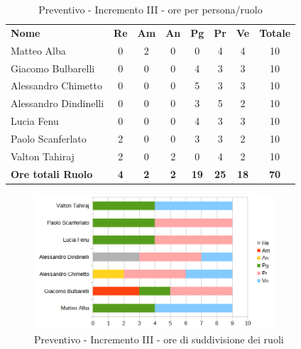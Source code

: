 	\begin{table} [h!]
	\begin{center}
		\begin{tabular} { m{3.5cm} c c c c c c c }
			\rowcolor{lightgray}
			\textbf{Nome} & \textbf{Re} & \textbf{Am} & \textbf{An} & \textbf{Pg} & \textbf{Pr} & \textbf{Ve} & \textbf{Totale} \\
			Matteo Alba &0 &2 & 0& 0 &4 & 4 & 10 \\
			Giacomo Bulbarelli & 0 &0 & 0& 4 & 3 & 3 & 10 \\
			Alessandro Chimetto & 0 & 0& 0& 5 & 3 & 3 & 10 \\
			Alessandro Dindinelli & 0& 0 & 0& 3 & 5 &2 & 10 \\
			Lucia Fenu & 0 & 0 &0 & 4 & 3 & 3 & 10 \\
			Paolo Scanferlato &2 & 0 &0 & 3 & 3 & 2 & 10 \\
			Valton Tahiraj & 2& 0 &2 & 0 & 4 & 2 & 10 \\
			\textbf{Ore totali Ruolo} & \textbf{4} & \textbf{2} & \textbf{2} & \textbf{19} & \textbf{25}& \textbf{18} & \textbf{70}
		\end{tabular}
		\caption{Preventivo - Incremento III - ore per persona/ruolo}
	\end{center}
\end{table}
\begin{figure} [h!]
	\centering
	\includegraphics[width=0.8\textwidth]{res/img/preventivi/3-barre.png}
	\caption{Preventivo - Incremento III - ore di suddivisione dei ruoli} 
\end{figure}

\newpage

